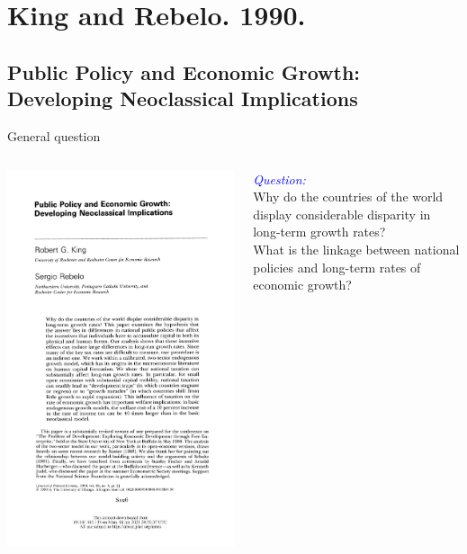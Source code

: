 \documentclass[xcolor=dvipsnames, t]{beamer}
\begin{document}
	\section{King and Rebelo. 1990.}
	\subsection{Public Policy and Economic Growth: Developing Neoclassical Implications}
	\begin{frame}[fragile]{General question}
		\begin{columns}[T]
			\begin{column}{0.4\textwidth}
				\includegraphics[width=0.8\linewidth]{king.png}
			\end{column}
			\begin{column}{0.56\textwidth}
				\begin{center}
					\textit{\textcolor{blue}{Question:}}\\ \pause
					\bigskip		
					Why do the countries of the world display considerable disparity in long-term growth rates?\\ \pause
					\bigskip		
					What is the linkage between national policies and long-term rates of economic growth?
				\end{center}
			\end{column}
		\end{columns}
	\end{frame}
	
\end{document}
